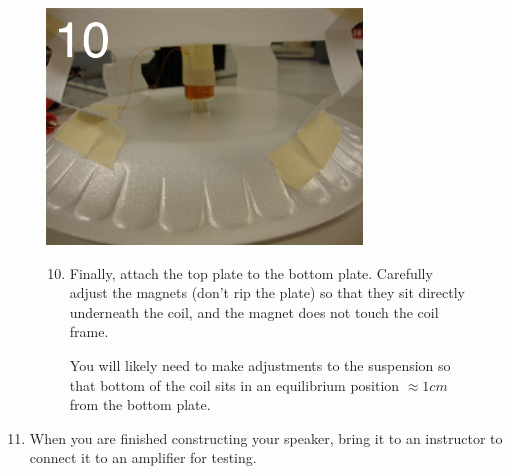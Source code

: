 \documentclass[11pt]{article}
\begin{document}
\vspace{1.6cm}

\begin{figure}[H]
	\begin{minipage}[b]{0.4\linewidth}
		\centering	\includegraphics[width=\textwidth]{images/finished.pdf}
	\end{minipage}
	\hspace{0.1cm}
	\begin{minipage}[b]{0.59\linewidth}
		\begin{enumerate} \setcounter{enumi}{9}
			\item Finally, attach the top plate to the bottom plate. Carefully adjust the magnets (don't rip the plate) so that they sit directly 				underneath the coil, and the magnet does not touch the coil frame.
			
				You will likely need to make adjustments to the suspension so that bottom of the coil sits in an equilibrium position $				\approx 1cm$ from the bottom plate. 
			\vspace{1.5cm}
		\end{enumerate}
	\end{minipage}
\end{figure}

\begin{enumerate} \setcounter{enumi}{10}
	\item When you are finished constructing your speaker, bring it to an instructor to connect it to an amplifier for testing.
\end{enumerate}

\newpage
\end{document}
